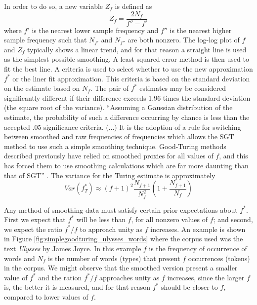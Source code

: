 In order to do so, a new variable $Z_f$ is defined as 
\begin{equation}
Z_f = \frac{2 N_f}{f'' - f'}
\end{equation}
where $f'$ is the nearest lower sample frequency and $f''$ is the nearest higher sample frequency
such that $N_{f'}$ and $N_{f''}$ are both nonzero.
The log-log plot of $f$ and $Z_f$ typically shows a linear trend, and for that reason a straight line
is used as the simplest possible smoothing. A least squared error method is then used to fit the best
line. A criteria is used to select whether to use the new approximation $f^\ast$ or the liner fit
approximation. This criteria is based on the standard deviation on the estimate based on $N_f$.
The pair of $f^\ast$ estimates may be considered significantly different if their difference exceeds
1.96 times the standard deviation (the square root of the variance). 
``Assuming a Gaussian distribution of the estimate, the probability of
such a difference occurring by chance is less than the accepted .05 significance criteria. (...)
It is the adoption of a rule for switching between smoothed and raw frequencies of frequencies which
allows the SGT method to use such a simple smoothing technique. Good-Turing methods described previously
have relied on smoothed proxies for all values of $f$, and this has forced them to use smoothing calculations
which are far more daunting than that of SGT'' \citep{galesampson95}.
The variance for the Turing estimate is approximately
\begin{equation}
Var(f^\ast_T) \approx (f+1)^2 \frac{N_{f+1}}{N_f^2} \left( 1 + \frac{N_{f+1}}{N_f} \right)
\end{equation}



Any method of smoothing data must satisfy certain prior expectations about $f^\ast$. First we expect that
$f^\ast$ will be less than $f$, for all nonzero values of $f$; and second, we expect the ratio $f^\ast/f$
to approach unity as $f$ increases. An example is shown in Figure \ref{fig:simplegoodturing_ulysses_words} where the corpus used was the 
text \textit{Ulysses} by James Joyce. In this example $f$ is the frequency of occurrence of words
and $N_f$ is the number of words (types) that present $f$ occurrences (tokens) in the corpus.
We might observe that the smoothed version present a smaller value of $f^\ast$ and the ration
$f^\ast/f$ approaches unity as $f$ increases, since the larger $f$ is, the better it is measured,
and for that reason $f^\ast$ should be closer to $f$, compared to lower values of $f$.


